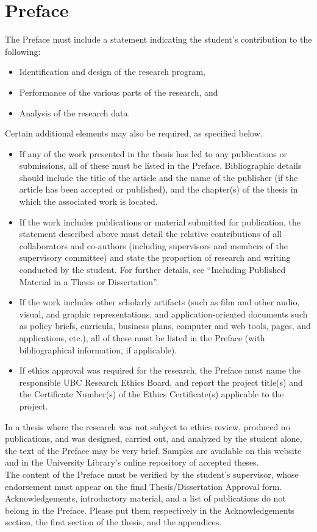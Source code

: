 \chapter*{Preface}
  The Preface must include a statement indicating the student's contribution to the following:
  \begin{itemize}
    \item Identification and design of the research program,
    \item Performance of the various parts of the research, and
    \item Analysis of the research data.
  \end{itemize}
  Certain additional elements may also be required, as specified below.
  \begin{itemize}
    \item If any of the work presented in the thesis has led to any publications or submissions, all 
      of these must be listed in the Preface. Bibliographic details should include the title of the 
      article and the name of the publisher (if the article has been accepted or published), and the 
      chapter(s) of the thesis in which the associated work is located.
    \item If the work includes publications or material submitted for publication, the statement 
      described above must detail the relative contributions of all collaborators and co-authors 
      (including supervisors and members of the supervisory committee) and state the proportion of 
      research and writing conducted by the student. For further details, see “Including Published 
      Material in a Thesis or Dissertation”.
    \item If the work includes other scholarly artifacts (such as film and other audio, visual, and 
      graphic representations, and application-oriented documents such as policy briefs, curricula, 
      business plans, computer and web tools, pages, and applications, etc.), all of these must be 
      listed in the Preface (with bibliographical information, if applicable).
    \item If ethics approval was required for the research, the Preface must name the responsible 
      UBC Research Ethics Board, and report the project title(s) and the Certificate Number(s) of 
      the Ethics Certificate(s) applicable to the project.
  \end{itemize}
  In a thesis where the research was not subject to ethics review, produced no publications, and was 
    designed, carried out, and analyzed by the student alone, the text of the Preface may be very 
    brief. Samples are available on this website and in the University Library's online repository 
    of accepted theses. \\
  The content of the Preface must be verified by the student's supervisor, whose endorsement must 
    appear on the final Thesis/Dissertation Approval form. \\
  Acknowledgements, introductory material, and a list of publications do not belong in the Preface. 
    Please put them respectively in the Acknowledgements section, the first section of the thesis, 
    and the appendices. \\

